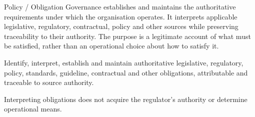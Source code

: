 Policy /\allowbreak{} Obligation Governance establishes and maintains the authoritative requirements under which the organisation operates. It interprets applicable legislative, regulatory, contractual, policy and other sources while preserving traceability to their authority. The purpose is a legitimate account of what must be satisfied, rather than an operational choice about how to satisfy it.



Identify, interpret, establish and maintain authoritative legislative, regulatory, policy, standards, guideline, contractual and other obligations, attributable and traceable to source authority.



Interpreting obligations does not acquire the regulator's authority or determine operational means.


